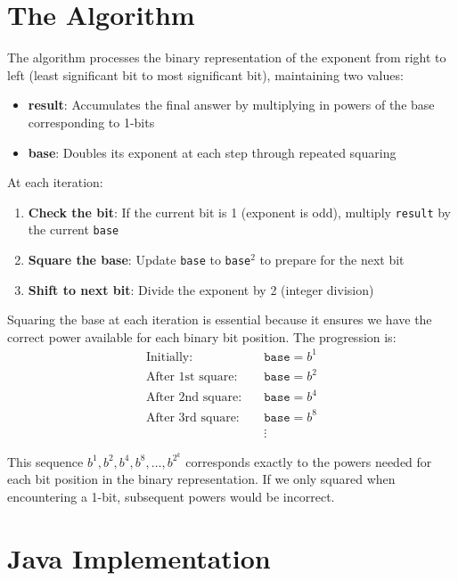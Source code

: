 \documentclass{article}
\begin{document}
	\section{The Algorithm}
	The algorithm processes the binary representation of the exponent from right to left (least significant bit to most significant bit), maintaining two values:
	\begin{itemize}[itemsep=2pt]
		\item \textbf{result}: Accumulates the final answer by multiplying in powers of the base corresponding to 1-bits
		\item \textbf{base}: Doubles its exponent at each step through repeated squaring
	\end{itemize}
	
	At each iteration:
	\begin{enumerate}[itemsep=2pt]
		\item \textbf{Check the bit}: If the current bit is 1 (exponent is odd), multiply \texttt{result} by the current \texttt{base}
		\item \textbf{Square the base}: Update \texttt{base} to \texttt{base}$^2$ to prepare for the next bit
		\item \textbf{Shift to next bit}: Divide the exponent by 2 (integer division)
	\end{enumerate}

	Squaring the base at each iteration is essential because it ensures we have the correct power available for each binary bit position. The progression is:
	\begin{align*}
		\text{Initially:} \quad & \texttt{base} = b^1 \\
		\text{After 1st square:} \quad & \texttt{base} = b^2 \\
		\text{After 2nd square:} \quad & \texttt{base} = b^4 \\
		\text{After 3rd square:} \quad & \texttt{base} = b^8 \\
		& \vdots
	\end{align*}
	
	This sequence $b^1, b^2, b^4, b^8, \ldots, b^{2^k}$ corresponds exactly to the powers needed for each bit position in the binary representation. If we only squared when encountering a 1-bit, subsequent powers would be incorrect.
	
	\section{Java Implementation}
	
\end{document}
